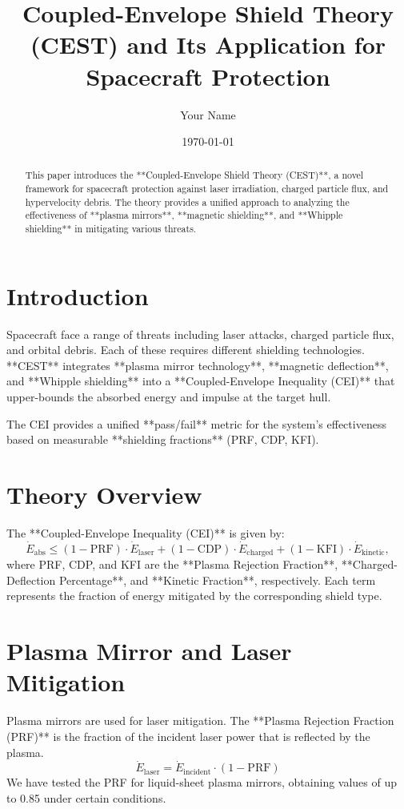 \documentclass[12pt]{article}
\title{Coupled-Envelope Shield Theory (CEST) and Its Application for Spacecraft Protection}
\author{Your Name}
\date{\today}
\begin{document}
\maketitle

\begin{abstract}
    This paper introduces the **Coupled-Envelope Shield Theory (CEST)**, a novel framework for spacecraft protection against laser irradiation, charged particle flux, and hypervelocity debris. The theory provides a unified approach to analyzing the effectiveness of **plasma mirrors**, **magnetic shielding**, and **Whipple shielding** in mitigating various threats.
\end{abstract}

\section{Introduction}
    Spacecraft face a range of threats including laser attacks, charged particle flux, and orbital debris. Each of these requires different shielding technologies. **CEST** integrates **plasma mirror technology**, **magnetic deflection**, and **Whipple shielding** into a **Coupled-Envelope Inequality (CEI)** that upper-bounds the absorbed energy and impulse at the target hull.
    
    The CEI provides a unified **pass/fail** metric for the system's effectiveness based on measurable **shielding fractions** (PRF, CDP, KFI).

\section{Theory Overview}
    The **Coupled-Envelope Inequality (CEI)** is given by:
    \[
    \dot E_{\mathrm{abs}} \le (1-\mathrm{PRF}) \cdot \dot E_{\mathrm{laser}} + (1-\mathrm{CDP}) \cdot \dot E_{\mathrm{charged}} + (1-\mathrm{KFI}) \cdot \dot E_{\mathrm{kinetic}},
    \]
    where PRF, CDP, and KFI are the **Plasma Rejection Fraction**, **Charged-Deflection Percentage**, and **Kinetic Fraction**, respectively. Each term represents the fraction of energy mitigated by the corresponding shield type.

\section{Plasma Mirror and Laser Mitigation}
    Plasma mirrors are used for laser mitigation. The **Plasma Rejection Fraction (PRF)** is the fraction of the incident laser power that is reflected by the plasma. 
    \[
    \dot E_{\mathrm{laser}} = \dot E_{\mathrm{incident}} \cdot (1 - \mathrm{PRF})
    \]
    We have tested the PRF for liquid-sheet plasma mirrors, obtaining values of up to 0.85 under certain conditions.
\end{document}

